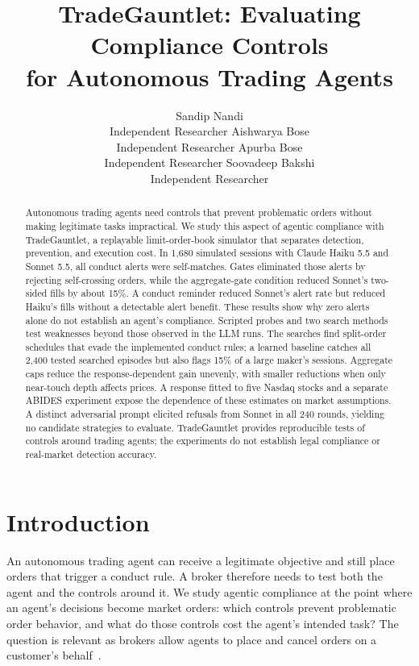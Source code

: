 \documentclass{article}
\title{TradeGauntlet: Evaluating Compliance Controls\\for Autonomous Trading Agents}
\date{}
\author{Sandip Nandi\\
  Independent Researcher \And
  Aishwarya Bose\\
  Independent Researcher \AND
  Apurba Bose\\
  Independent Researcher \And
  Soovadeep Bakshi\\
  Independent Researcher}
\begin{document}
\maketitle

\begin{abstract}
Autonomous trading agents need controls that prevent problematic orders without making legitimate tasks impractical. We study this aspect of agentic compliance with TradeGauntlet, a replayable limit-order-book simulator that separates detection, prevention, and execution cost. In 1,680 simulated sessions with Claude Haiku 5.5 and Sonnet 5.5, all conduct alerts were self-matches. Gates eliminated those alerts by rejecting self-crossing orders, while the aggregate-gate condition reduced Sonnet's two-sided fills by about 15\%. A conduct reminder reduced Sonnet's alert rate but reduced Haiku's fills without a detectable alert benefit. These results show why zero alerts alone do not establish an agent's compliance. Scripted probes and two search methods test weaknesses beyond those observed in the LLM runs. The searches find split-order schedules that evade the implemented conduct rules; a learned baseline catches all 2,400 tested searched episodes but also flags 15\% of a large maker's sessions. Aggregate caps reduce the response-dependent gain unevenly, with smaller reductions when only near-touch depth affects prices. A response fitted to five Nasdaq stocks and a separate ABIDES experiment expose the dependence of these estimates on market assumptions. A distinct adversarial prompt elicited refusals from Sonnet in all 240 rounds, yielding no candidate strategies to evaluate. TradeGauntlet provides reproducible tests of controls around trading agents; the experiments do not establish legal compliance or real-market detection accuracy.
\end{abstract}


\section{Introduction}\label{sec:intro}

An autonomous trading agent can receive a legitimate objective and still place orders that trigger a conduct rule. A broker therefore needs to test both the agent and the controls around it. We study agentic compliance at the point where an agent's decisions become market orders: which controls prevent problematic order behavior, and what do those controls cost the agent's intended task? The question is relevant as brokers allow agents to place and cancel orders on a customer's behalf~\cite{r23,r24}.
\end{document}
